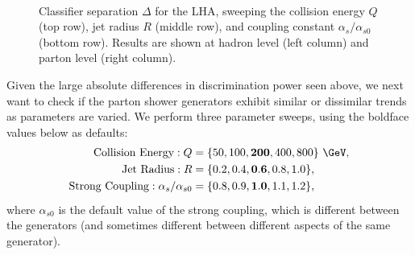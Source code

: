 \documentclass[11pt]{cernrep}
\begin{document}
\begin{figure}
$\qquad$
\caption{Classifier separation $\Delta$ for the LHA, sweeping the collision energy $Q$ (top row), jet radius $R$ (middle row), and coupling constant $\alpha_s/\alpha_{s0}$ (bottom row).  Results are shown at hadron level (left column) and parton level (right column).}
\label{quarkgluon_fig:ee_sweep}
\end{figure}

Given the large absolute differences in discrimination power seen above, we next want to check if the parton shower generators exhibit similar or dissimilar trends as parameters are varied.  We perform three parameter sweeps, using the boldface values below as defaults:
\begin{equation}
\begin{aligned}
\text{Collision Energy}: Q &= \{ 50, 100, \mathbf{200}, 400, 800\}~\GeV, \\
\text{Jet Radius}: R &= \{ 0.2, 0.4, \mathbf{0.6}, 0.8, 1.0\}, \\
\text{Strong Coupling}: \alpha_s / \alpha_{s0} &= \{0.8,0.9,\mathbf{1.0},1.1,1.2\}, \\
\end{aligned}
\end{equation}
where $\alpha_{s0}$ is the default value of the strong coupling, which is different between the generators (and sometimes different between different aspects of the same generator).
\end{document}
